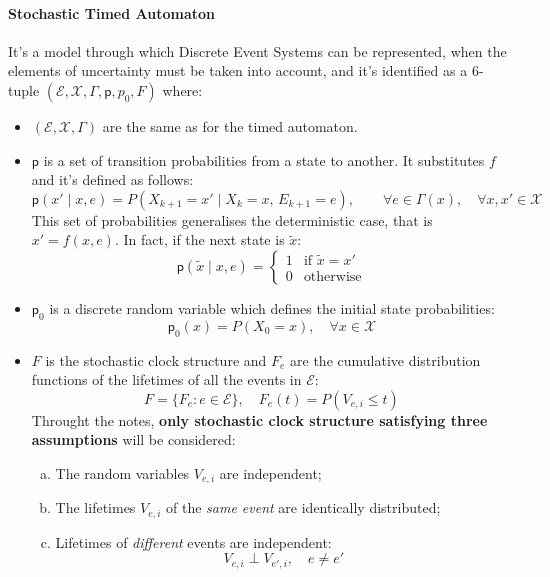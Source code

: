 \documentclass[12pt,a4paper]{article}
\newcommand*{\transp}{\mathsf{p}}
\begin{document}
\paragraph{Stochastic Timed Automaton}
It’s a model through which Discrete Event Systems can be represented, when the elements of uncertainty must be taken into account, and it’s identified as a $6$-tuple $(\mathcal{E},\mathcal{X},\Gamma,\transp,p_0,F)$ where:
\begin{itemize}
\item $(\mathcal{E},\mathcal{X},\Gamma)$ are the same as for the timed automaton.
\item $\transp$ is a set of transition probabilities from a state to another. It substitutes $f$ and it’s defined as follows:
$$
\transp(x' \mid x,e) = P\left(X_{k+1} = x' \mid X_k = x, \, E_{k+1} = e\right), \qquad \forall e \in \Gamma(x) , \quad \forall x,x' \in \mathcal{X}
$$
This set of probabilities generalises the deterministic case, that is $x' = f(x,e)$. In fact, if the next state is $\tilde{x}$:
\begin{equation*}
\transp(\tilde{x} \mid x, e) =
\begin{cases}
1 &\text{if } \tilde{x} = x' \\
0 &\text{otherwise}
\end{cases}
\end{equation*}
\item $\transp_0$ is a discrete random variable which defines the initial state probabilities:
\begin{equation*}
\transp_0(x) = P(X_0 = x), \quad \forall x\in \mathcal{X}
\end{equation*}
\item $F$ is the stochastic clock structure and $F_e$ are the cumulative distribution functions of the lifetimes of all the events in $\mathcal{E}$:
\begin{equation*}
F = \{F_e : e \in \mathcal{E}\}, \quad F_e(t) = P(V_{e,i} \leq t)
\end{equation*}
Throught the notes, \textbf{only stochastic clock structure satisfying three assumptions} will be considered:
\begin{enumerate}[(a)]
	\item The random variables $V_{e,i}$ are independent;
	\item The lifetimes $V_{e,i}$ of the \textit{same event} are identically distributed;
	\item Lifetimes of \textit{different} events are independent:
	\begin{equation*}
		V_{e,i} \perp V_{e',i}, \quad e \neq e'
	\end{equation*}
\end{enumerate}
\end{itemize}
\end{document}
